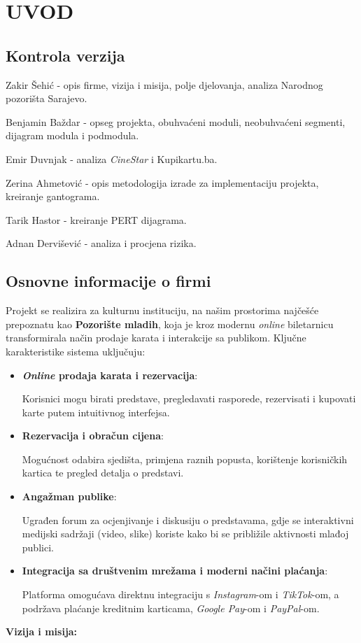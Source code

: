 \sloppy
\chapter{UVOD}

\sloppy
\section*{Kontrola verzija}

Zakir Šehić - opis firme, vizija i misija, polje djelovanja, analiza Narodnog pozorišta Sarajevo.

\noindent Benjamin Baždar - opseg projekta, obuhvaćeni moduli, neobuhvaćeni segmenti, dijagram modula i podmodula.

\noindent Emir Duvnjak - analiza \textit{CineStar} i Kupikartu.ba.

\noindent Zerina Ahmetović - opis metodologija izrade za implementaciju projekta, kreiranje gantograma.

\noindent Tarik Hastor - kreiranje PERT dijagrama.

\noindent Adnan Dervišević - analiza i procjena rizika.

\sloppy
\section{Osnovne informacije o firmi}

Projekt se realizira za kulturnu instituciju, na našim prostorima najčešće prepoznatu kao \textbf{Pozorište mladih}, koja je kroz modernu \textit{online} biletarnicu transformirala način prodaje karata i interakcije sa publikom. Ključne karakteristike sistema uključuju:
\begin{itemize}
  \item \textbf{\textit{Online} prodaja karata i rezervacija}:

  Korisnici mogu birati predstave, pregledavati rasporede, rezervisati i kupovati karte putem intuitivnog interfejsa.
  
  \item \textbf{Rezervacija i obračun cijena}:

  Mogućnost odabira sjedišta, primjena raznih popusta, korištenje korisničkih kartica te pregled detalja o predstavi.
  
  \item \textbf{Angažman publike}:
  
  Ugrađen forum za ocjenjivanje i diskusiju o predstavama, gdje se interaktivni medijski sadržaji (video, slike) koriste kako bi se približile aktivnosti mlađoj publici.
  
  \item \textbf{Integracija sa društvenim mrežama i moderni načini plaćanja}: 
  
  Platforma omogućava direktnu integraciju s \textit{Instagram}-om i \textit{TikTok}-om, a podržava plaćanje kreditnim karticama, \textit{Google Pay}-om i \textit{PayPal}-om.
\end{itemize}
\noindent\textbf{Vizija i misija:}

